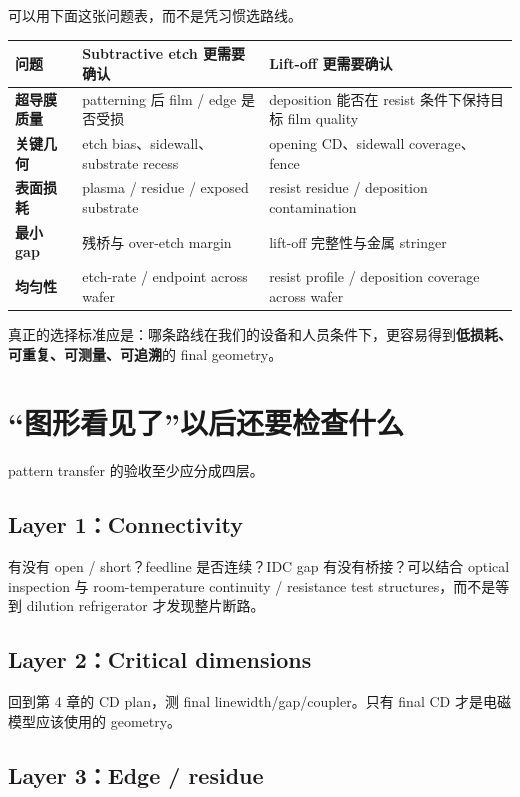 可以用下面这张问题表，而不是凭习惯选路线。

\begin{center}
\begin{tabularx}{0.96\textwidth}{>{\bfseries}p{}XX}
\toprule
问题 & Subtractive etch 更需要确认 & Lift-off 更需要确认 \\
\midrule
超导膜质量 & patterning 后 film / edge 是否受损 & deposition 能否在 resist 条件下保持目标 film quality \\
关键几何 & etch bias、sidewall、substrate recess & opening CD、sidewall coverage、fence \\
表面损耗 & plasma / residue / exposed substrate & resist residue / deposition contamination \\
最小 gap & 残桥与 over-etch margin & lift-off 完整性与金属 stringer \\
均匀性 & etch-rate / endpoint across wafer & resist profile / deposition coverage across wafer \\
\bottomrule
\end{tabularx}
\end{center}

真正的选择标准应是：哪条路线在我们的设备和人员条件下，更容易得到\textbf{低损耗、可重复、可测量、可追溯}的 final geometry。

\section{“图形看见了”以后还要检查什么}

pattern transfer 的验收至少应分成四层。

\subsection{Layer 1：Connectivity}

有没有 open / short？feedline 是否连续？IDC gap 有没有桥接？可以结合 optical inspection 与 room-temperature continuity / resistance test structures，而不是等到 dilution refrigerator 才发现整片断路。

\subsection{Layer 2：Critical dimensions}

回到第 4 章的 CD plan，测 final linewidth/gap/coupler。只有 final CD 才是电磁模型应该使用的 geometry。

\subsection{Layer 3：Edge / residue}

